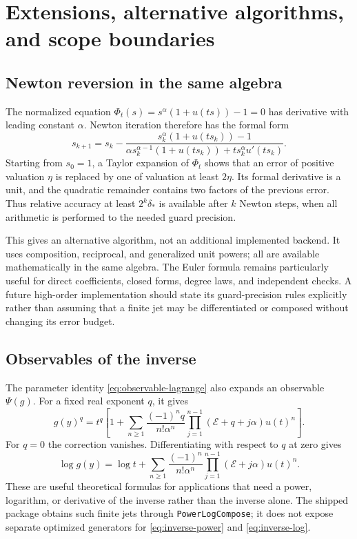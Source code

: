 \documentclass[11pt,a4paper]{article}
\numberwithin{equation}{section}
\theoremstyle{definition}\newtheorem{definition}[theorem]{Definition}
\theoremstyle{remark}\newtheorem{remark}[theorem]{Remark}
\newcommand{\Eul}{\mathcal E}
\DeclareRobustCommand{\code}[1]{{\small\ttfamily\urlstyle{same}\nolinkurl{#1}}}
\begin{document}
\section{Extensions, alternative algorithms, and scope boundaries}
\label{sec:extensions}

\subsection{Newton reversion in the same algebra}
The normalized equation \(\Phi_t(s)=s^\alpha(1+u(ts))-1=0\) has derivative
with leading constant \(\alpha\). Newton iteration therefore has the formal
form
\begin{equation}\label{eq:newton}
 s_{k+1}=s_k-
 \frac{s_k^\alpha(1+u(ts_k))-1}
 {\alpha s_k^{\alpha-1}(1+u(ts_k))+t s_k^\alpha u'(ts_k)}.
\end{equation}
Starting from \(s_0=1\), a Taylor expansion of \(\Phi_t\) shows that an error
of positive valuation \(\eta\) is replaced by one of valuation at least
\(2\eta\). Its formal derivative is a unit, and the quadratic remainder
contains two factors of the previous error. Thus relative accuracy at least
\(2^k\delta_*\) is available after \(k\) Newton steps, when all arithmetic is
performed to the needed guard precision.

This gives an alternative algorithm, not an additional implemented backend.
It uses composition, reciprocal, and generalized unit powers; all are
available mathematically in the same algebra. The Euler formula remains
particularly useful for direct coefficients, closed forms, degree laws,
and independent checks. A future high-order implementation should state
its guard-precision rules explicitly rather than assuming that a finite
jet may be differentiated or composed without changing its error budget.

\subsection{Observables of the inverse}
The parameter identity \eqref{eq:observable-lagrange} also expands an
observable \(\Psi(g)\). For a fixed real exponent \(q\), it gives
\begin{equation}\label{eq:inverse-power}
 g(y)^q=t^q\left[1+\sum_{n\ge1}
 \frac{(-1)^n q}{n!\alpha^n}
 \prod_{j=1}^{n-1}(\Eul+q+j\alpha)u(t)^n\right].
\end{equation}
For \(q=0\) the correction vanishes. Differentiating with respect to \(q\)
at zero gives
\begin{equation}\label{eq:inverse-log}
 \log g(y)=\log t+\sum_{n\ge1}\frac{(-1)^n}{n!\alpha^n}
 \prod_{j=1}^{n-1}(\Eul+j\alpha)u(t)^n.
\end{equation}
These are useful theoretical formulas for applications that need a power,
logarithm, or derivative of the inverse rather than the inverse alone.
The shipped package obtains such finite jets through
\code{PowerLogCompose}; it does not expose separate optimized generators
for \eqref{eq:inverse-power} and \eqref{eq:inverse-log}.
\end{document}
